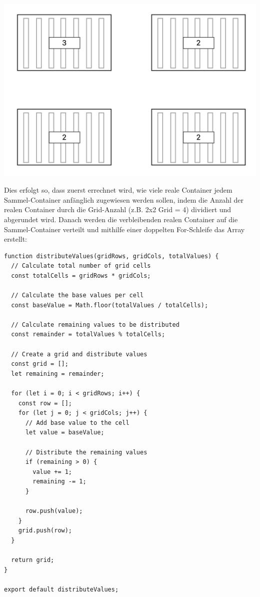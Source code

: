 \documentclass[
    headings=optiontotocandhead,%
    twoside,
    numbers=noenddot,%
    12pt, %
    titlepage, %
    parskip=full, %
    listof=leveldown, 
    numbers=noenddot, %
    a4paper,DIV=14,
    BCOR=15mm,
]{scrbook}
\let\origfigure=\figure
\let\endorigfigure=\endfigure
\renewenvironment{figure}[1][]{%
   \origfigure[H]
}{%
   \endorigfigure
}
\begin{document}
\begin{figure}
\centering
\includegraphics{img/Gekle/GridExample.PNG}
\caption{Wie das 2x2 Grid laut obigen Angaben auf der Website aussieht}
\end{figure}

Dies erfolgt so, dass zuerst errechnet wird, wie viele reale Container
jedem Sammel-Container anfänglich zugewiesen werden sollen, indem die
Anzahl der realen Container durch die Grid-Anzahl (z.B. 2x2 Grid = 4)
dividiert und abgerundet wird. Danach werden die verbleibenden realen
Container auf die Sammel-Container verteilt und mithilfe einer doppelten
For-Schleife das Array erstellt:

\begin{lstlisting}[caption={Code des ContainerDistributor Skripts}]
function distributeValues(gridRows, gridCols, totalValues) {
  // Calculate total number of grid cells
  const totalCells = gridRows * gridCols;

  // Calculate the base values per cell
  const baseValue = Math.floor(totalValues / totalCells);

  // Calculate remaining values to be distributed
  const remainder = totalValues % totalCells;

  // Create a grid and distribute values
  const grid = [];
  let remaining = remainder;

  for (let i = 0; i < gridRows; i++) {
    const row = [];
    for (let j = 0; j < gridCols; j++) {
      // Add base value to the cell
      let value = baseValue;

      // Distribute the remaining values
      if (remaining > 0) {
        value += 1;
        remaining -= 1;
      }

      row.push(value);
    }
    grid.push(row);
  }

  return grid;
}

export default distributeValues;
\end{lstlisting}
\end{document}
